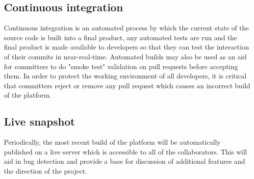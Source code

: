 \subsection{Continuous integration}
\label{sec:continuous-integration}

Continuous integration is an automated process by which the current state of the source code is
built into a final product, any automated tests are run and the final product is made available
to developers so that they can test the interaction of their commits in near-real-time.
Automated builds may also be used as an aid for committers to do "smoke test" validation on pull
requests before accepting them. In order to protect the working environment of all developers,
it is critical that committers reject or remove any pull request which causes an incorrect build
of the platform.

\subsection{Live snapshot}
\label{sec:live-snapshot}

Periodically, the most recent build of the \learnpad platform will be automatically published
on a live server which is accessible to all of the collaborators. This will aid in bug detection
and provide a base for discussion of additional features and the direction of the project.
